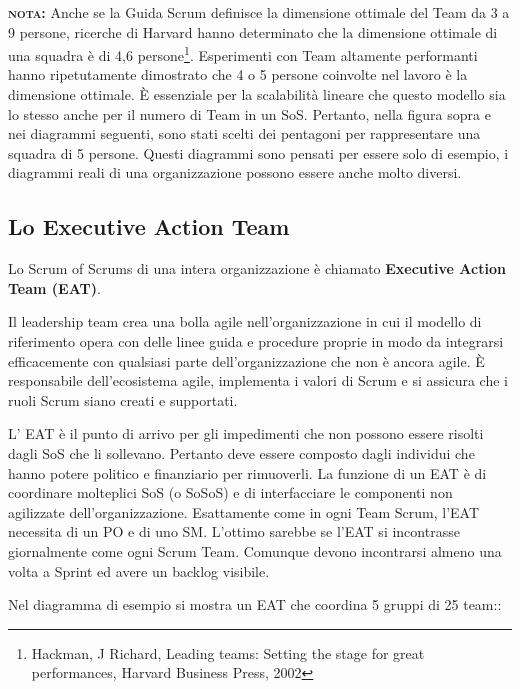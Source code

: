 \documentclass[12pt,a4paper,parskip=full]{scrartcl}
\begin{document}
\textbf{\textsc{nota:}} Anche se la Guida Scrum definisce la dimensione ottimale del Team da 3 a 9 persone, ricerche di Harvard hanno determinato che la dimensione ottimale di una  squadra è di 4,6 persone\footnote{Hackman, J Richard, Leading teams: Setting the stage for
great performances, Harvard Business Press, 2002}. Esperimenti con Team altamente performanti hanno ripetutamente dimostrato che 4 o 5 persone coinvolte nel lavoro è la dimensione ottimale. È essenziale per la scalabilità lineare che questo modello sia lo stesso anche per il numero di Team in un SoS. Pertanto, nella figura sopra e nei diagrammi seguenti, sono stati scelti dei pentagoni per rappresentare una squadra di 5 persone. Questi diagrammi sono pensati per essere solo di esempio, i diagrammi reali di una organizzazione possono essere anche molto diversi.

\subsection{Lo Executive Action Team}
Lo Scrum of Scrums di una intera organizzazione è chiamato \textbf{Executive Action Team (EAT)}. 

Il leadership team crea una bolla agile nell'organizzazione in cui il modello di riferimento opera con delle linee guida e procedure proprie in modo da integrarsi efficacemente con qualsiasi parte dell'organizzazione che non è ancora agile. È responsabile dell'ecosistema agile, implementa i valori di Scrum e si assicura che i ruoli Scrum siano creati e supportati.

L' EAT è il punto di arrivo per gli impedimenti che non possono essere risolti dagli SoS che li sollevano. Pertanto deve essere composto dagli individui che hanno potere politico e finanziario per rimuoverli. La funzione di un EAT è di coordinare molteplici SoS (o SoSoS) e di interfacciare le componenti non agilizzate dell'organizzazione. Esattamente come in ogni Team Scrum, l'EAT necessita di un PO e di uno SM. L'ottimo sarebbe se l'EAT si incontrasse giornalmente come ogni Scrum Team. Comunque devono incontrarsi almeno una volta a Sprint ed avere un backlog visibile.

Nel diagramma di esempio si mostra un EAT che coordina 5 gruppi di 25 team::
\end{document}
